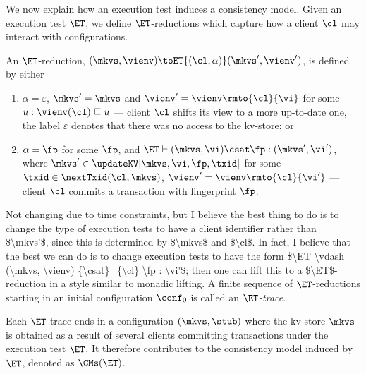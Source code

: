 We now explain how an execution test induces a consistency model. Given an execution test $\ET$, 
we define $\ET$-reductions which capture how a client $\cl$ may
interact with configurations. 
\begin{definition}[ET-reduction]
An $\ET$-reduction, $(\mkvs, \vienv) \toET{(\cl, \alpha)} (\mkvs', \vienv')$, is defined by
either 
\begin{enumerate}
    \item $\alpha = \varepsilon$, $\mkvs' = \mkvs$ and $\vienv' = \vienv\rmto{\cl}{\vi}$ for some $u: \vienv(\cl) \sqsubseteq u$ ---
	client $\cl$ shifts its view to a more up-to-date one, the label $\varepsilon$ denotes that 
	there was no access to the kv-store; or
\item $\alpha = \fp$ for some $\fp$, and $\ET \vdash (\mkvs, \vi ) \csat \fp : (\mkvs', \vi')$, where $\mkvs' \in \updateKV[\mkvs, \vi, \fp, \txid]$ 
   for some $\txid \in \nextTxid(\cl, \mkvs)$, $\vienv' =
   \vienv\rmto{\cl}{\vi'}$ ---  client $\cl$ 
	commits a transaction with fingerprint $\fp$.
\end{enumerate}
\ac{Not changing due to time constraints, but I believe the best thing to do is to change the type of execution tests to have a client identifier 
rather than $\mkvs'$, since this is determined by $\mkvs$ and $\cl$. In fact, I believe that the best we can do is to change execution tests to 
have the form $\ET \vdash (\mkvs, \vienv) {\csat}_{\cl} \fp : \vi'$; then one can lift this to a $\ET$-reduction in a style similar to monadic lifting.}
A finite sequence of $\ET$-reductions starting in an
initial configuration $\conf_{0}$ is called  an \emph{$\ET$-trace}. 
\end{definition}
Each $\ET$-trace  ends in a configuration $(\mkvs, \stub)$ where the 
kv-store $\mkvs$ is obtained as a result of several clients committing transactions under the 
execution test $\ET$. It therefore contributes to the consistency model induced by $\ET$, 
denoted as $\CMs(\ET)$.
%
